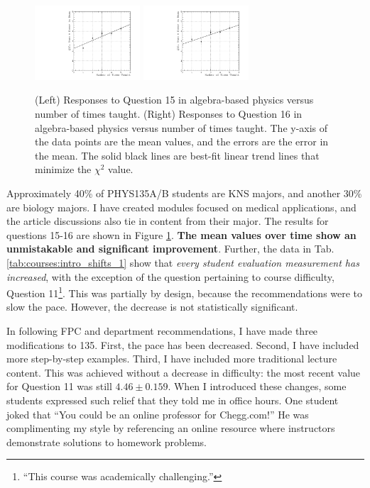 \documentclass[../../main.tex]{subfiles}
\begin{document}
\begin{figure}
\centering
\includegraphics[width=0.35\textwidth]{Q15_algebra_based.pdf}
\includegraphics[width=0.35\textwidth]{Q16_algebra_based.pdf}
\caption{\label{fig:courses:intro_q15}  (Left) Responses to Question 15 in algebra-based physics versus number of times taught. (Right) Responses to Question 16 in algebra-based physics versus number of times taught.  The y-axis of the data points are the mean values, and the errors are the error in the mean.  The solid black lines are best-fit linear trend lines that minimize the $\chi^2$ value.}
\end{figure}

Approximately 40\% of PHYS135A/B students are KNS majors, and another 30\% are biology majors.  I have created modules focused on medical applications, and the article discussions also tie in content from their major.  The results for questions 15-16 are shown in Figure \ref{fig:courses:intro_q15}.  \textbf{The mean values over time show an unmistakable and significant improvement}.  Further, the data in Tab. \ref{tab:courses:intro_shifts_1} show that \textit{every student evaluation measurement has increased}, with the exception of the question pertaining to course difficulty, Question 11\footnote{``This course was academically challenging.''}.  This was partially by design, because the recommendations were to slow the pace.  However, the decrease is not statistically significant.  \\ \hspace{0.1cm}

In following FPC and department recommendations, I have made three modifications to 135.  First, the pace has been decreased.  Second, I have included more step-by-step examples.  Third, I have included more traditional lecture content.  This was achieved without a decrease in difficulty: the most recent value for Question 11 was still $4.46 \pm 0.159$.  When I introduced these changes, some students expressed such relief that they told me in office hours.  One student joked that ``You could be an online professor for Chegg.com!'' He was complimenting my style by referencing an online resource where instructors demonstrate solutions to homework problems.  \\ \hspace{0.1cm}
\end{document}
